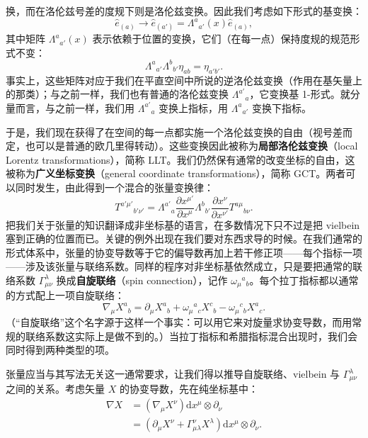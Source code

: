 换，而在洛伦兹号差的度规下则是洛伦兹变换。因此我们考虑如下形式的基变换：
\begin{equation*}
\hat{e}_{(a)} \to \hat{e}_{(a')} = \Lambda^{a}{}_{a'}(x)\hat{e}_{(a)},
\tag{J.14}
\end{equation*}
其中矩阵 $\Lambda^{a}{}_{a'}(x)$ 表示依赖于位置的变换，它们（在每一点）保持度规的规范形式不变：
\begin{equation*}
\Lambda^{a}{}_{a'}\Lambda^{b}{}_{b'}\eta_{ab} = \eta_{a'b'}.
\tag{J.15}
\end{equation*}
事实上，这些矩阵对应于我们在平直空间中所说的逆洛伦兹变换（作用在基矢量上的那类）；与之前一样，我们也有普通的洛伦兹变换 $\Lambda^{a'}{}_{a}$，它变换基 1-形式。就分量而言，与之前一样，我们用 $\Lambda^{a'}{}_{a}$ 变换上指标，用 $\Lambda^{a}{}_{a'}$ 变换下指标。

于是，我们现在获得了在空间的每一点都实施一个洛伦兹变换的自由（视号差而定，也可以是普通的欧几里得转动）。这些变换因此被称为\textbf{局部洛伦兹变换}（local Lorentz transformations），简称 LLT。我们仍然保有通常的改变坐标的自由，这被称为\textbf{广义坐标变换}（general coordinate transformations），简称 GCT。两者可以同时发生，由此得到一个混合的张量变换律：
\begin{equation*}
T^{a'\mu'}{}_{b'\nu'} = \Lambda^{a'}{}_{a}\frac{\partial x^{\mu'}}{\partial x^{\mu}}\Lambda^{b}{}_{b'}\frac{\partial x^{\nu}}{\partial x^{\nu'}}T^{a\mu}{}_{b\nu}.
\tag{J.16}
\end{equation*}
把我们关于张量的知识翻译成非坐标基的语言，在多数情况下只不过是把 vielbein 塞到正确的位置而已。关键的例外出现在我们要对东西求导的时候。在我们通常的形式体系中，张量的协变导数等于它的偏导数再加上若干修正项——每个指标一项——涉及该张量与联络系数。同样的程序对非坐标基依然成立，只是要把通常的联络系数 $\Gamma^{\lambda}_{\mu\nu}$ 换成\textbf{自旋联络}（spin connection），记作 $\omega_{\mu}{}^{a}{}_{b}$。每个拉丁指标都以通常的方式配上一项自旋联络：
\begin{equation*}
\nabla_{\mu}X^{a}{}_{b} = \partial_{\mu}X^{a}{}_{b} + \omega_{\mu}{}^{a}{}_{c}X^{c}{}_{b} - \omega_{\mu}{}^{c}{}_{b}X^{a}{}_{c}.
\tag{J.17}
\end{equation*}
（“自旋联络”这个名字源于这样一个事实：可以用它来对旋量求协变导数，而用常规的联络系数这实际上是做不到的。）当拉丁指标和希腊指标混合出现时，我们会同时得到两种类型的项。

张量应当与其写法无关这一通常要求，让我们得以推导自旋联络、vielbein 与 $\Gamma^{\lambda}_{\mu\nu}$ 之间的关系。考虑矢量 $X$ 的协变导数，先在纯坐标基中：
\begin{align*}
\nabla X &= (\nabla_{\mu}X^{\nu})\mathrm{d}x^{\mu}\otimes\partial_{\nu} \\
&= (\partial_{\mu}X^{\nu} + \Gamma^{\nu}_{\mu\lambda}X^{\lambda})\mathrm{d}x^{\mu}\otimes\partial_{\nu}. \tag{J.18}
\end{align*}

